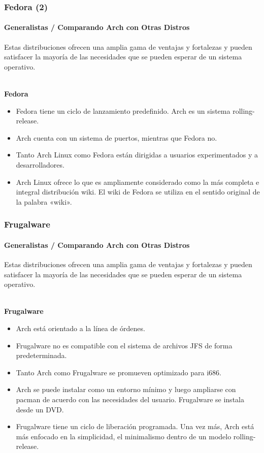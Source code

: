 \documentclass[9pt,t]{beamer}
\begin{document}
\begin{frame}\justifying
  \frametitle{Fedora (2)}
  \framesubtitle{Generalistas / Comparando Arch con Otras Distros}
    Estas distribuciones ofrecen una amplia gama de ventajas y fortalezas y pueden satisfacer la mayoría 
    de las necesidades que se pueden esperar de un sistema operativo.
    \ \\ \ \\
    {\small
    {\bf Fedora}
    \begin{itemize}\justifying
      \item Fedora tiene un ciclo de lanzamiento predefinido. Arch es un sistema rolling-release.
      \item Arch cuenta con un sistema de puertos, mientras que Fedora no.
      \item Tanto Arch Linux como Fedora están dirigidas a usuarios experimentados y a desarrolladores.
      \item Arch Linux ofrece lo que es ampliamente considerado como la más completa e integral distribución wiki.
      El wiki de Fedora se utiliza en el sentido original de la palabra «wiki».
    \end{itemize}
    }
\end{frame}

\begin{frame}\justifying
  \frametitle{Frugalware}
  \framesubtitle{Generalistas / Comparando Arch con Otras Distros}
    Estas distribuciones ofrecen una amplia gama de ventajas y fortalezas y pueden satisfacer la mayoría 
    de las necesidades que se pueden esperar de un sistema operativo.
    \ \\ \ \\
    {\small
    {\bf Frugalware}
    \begin{itemize}\justifying
      \item Arch está orientado a la línea de órdenes. 
      \item Frugalware no es compatible con el sistema de archivos JFS de forma predeterminada. 
      \item Tanto Arch como Frugalware se promueven optimizado para i686. 
      \item Arch se puede instalar como un entorno mínimo y luego ampliarse con pacman de acuerdo 
      con las necesidades del usuario. Frugalware se instala desde un DVD.
      \item Frugalware tiene un ciclo de liberación programada. Una vez más, Arch está más enfocado en la 
      simplicidad, el minimalismo dentro de un modelo rolling-release. 
    \end{itemize}
    }
\end{frame}
\end{document}
